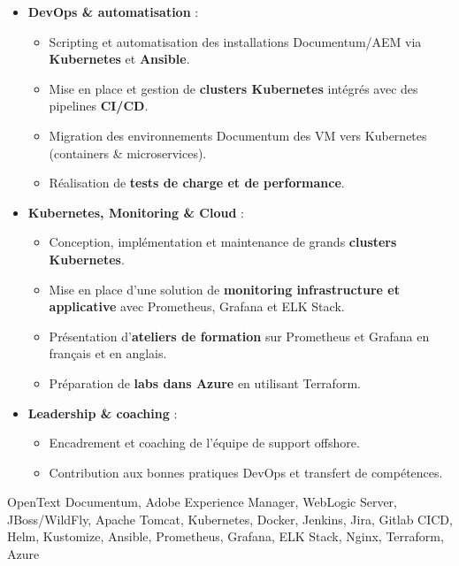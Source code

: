 \begin{experiences}
{\begin{itemize}[left=0pt,label={},itemsep=0.5em]
          \item \textbf{DevOps \& automatisation} :
            \begin{itemize}[itemsep=0.2em,topsep=0.2em,parsep=0pt]
              \small
              \item Scripting et automatisation des installations Documentum/AEM via \textbf{Kubernetes} et \textbf{Ansible}.
              \item Mise en place et gestion de \textbf{clusters Kubernetes} intégrés avec des pipelines \textbf{CI/CD}.
              \item Migration des environnements Documentum des VM vers Kubernetes (containers \& microservices).
              \item Réalisation de \textbf{tests de charge et de performance}.
            \end{itemize}

          \item \textbf{Kubernetes, Monitoring \& Cloud} :
            \begin{itemize}[itemsep=0.2em,topsep=0.2em,parsep=0pt]
              \small
              \item Conception, implémentation et maintenance de grands \textbf{clusters Kubernetes}.
              \item Mise en place d’une solution de \textbf{monitoring infrastructure et applicative} avec Prometheus, Grafana et ELK Stack.
              \item Présentation d’\textbf{ateliers de formation} sur Prometheus et Grafana en français et en anglais.
              \item Préparation de \textbf{labs dans Azure} en utilisant Terraform.
            \end{itemize}

          \item \textbf{Leadership \& coaching} :
            \begin{itemize}[itemsep=0.2em,topsep=0.2em,parsep=0pt]
              \small
              \item Encadrement et coaching de l’équipe de support offshore.
              \item Contribution aux bonnes pratiques DevOps et transfert de compétences.
            \end{itemize}

        \end{itemize}
    }
    {OpenText Documentum, Adobe Experience Manager, WebLogic Server, JBoss/WildFly, Apache Tomcat, Kubernetes, Docker, Jenkins, Jira, Gitlab CICD, Helm, Kustomize, Ansible, Prometheus, Grafana, ELK Stack, Nginx, Terraform, Azure}
    




\end{experiences}
